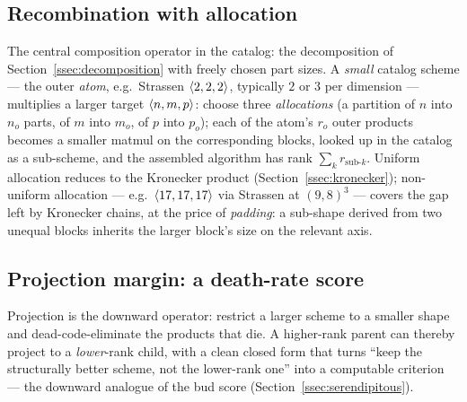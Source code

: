 \subsection{Recombination with allocation}
\label{ssec:recombination}

The central composition operator in the catalog: the decomposition of
Section~\ref{ssec:decomposition} with freely chosen part sizes. A \emph{small} catalog
scheme --- the outer \emph{atom}, e.g.\ Strassen \(\langle 2, 2, 2 \rangle\), typically \(2\) or
\(3\) per dimension --- multiplies a larger target \(\langle n, m, p \rangle\): choose three
\emph{allocations} (a partition of \(n\) into \(n_o\) parts, of \(m\) into \(m_o\), of
\(p\) into \(p_o\)); each of the atom's \(r_o\) outer products becomes a smaller matmul on
the corresponding blocks, looked up in the catalog as a sub-scheme, and the assembled
algorithm has rank \(\sum_k r_{\text{sub-}k}\). Uniform allocation reduces to the Kronecker
product (Section~\ref{ssec:kronecker}); non-uniform allocation --- e.g.\
\(\langle 17, 17, 17 \rangle\) via Strassen at \((9, 8)^3\) --- covers the gap left by Kronecker
chains, at the price of \emph{padding}: a sub-shape derived from two unequal blocks
inherits the larger block's size on the relevant axis.

\subsection{Projection margin: a death-rate score}
\label{ssec:projmargin}

Projection is the downward operator: restrict a larger scheme to a smaller shape and
dead-code-eliminate the products that die. A higher-rank parent can thereby project to a
\emph{lower}-rank child, with a clean closed form that turns ``keep the structurally better
scheme, not the lower-rank one'' into a computable criterion --- the downward analogue of
the bud score (Section~\ref{ssec:serendipitous}).


